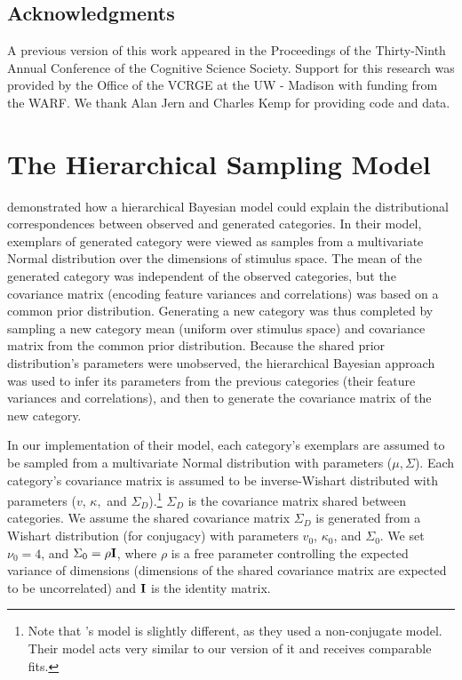 \documentclass[12pt]{article}
\begin{document}
\begin{flushleft}
\clearpage




\section{Acknowledgments}
A previous version of this work appeared in the Proceedings of the Thirty-Ninth Annual Conference of the Cognitive Science Society. Support for this research was provided by the Office of the VCRGE at the UW - Madison with funding from the WARF. We thank Alan Jern and Charles Kemp for providing code and data.



\end{flushleft}


\clearpage


\clearpage


\appendix

\section{The Hierarchical Sampling Model}
\label{ap:hsampling-definition}

\cite{jern2013probabilistic} demonstrated how a hierarchical Bayesian model could explain the distributional correspondences between observed and generated categories. In their model, exemplars of generated category were viewed as samples from a multivariate Normal distribution over the dimensions of stimulus space. The mean of the generated category was independent of the observed categories, but the covariance matrix (encoding feature variances and correlations) was based on a common prior distribution. Generating a new category was thus completed by sampling a new category mean (uniform over stimulus space) and covariance matrix from the common prior distribution. Because the shared prior distribution's parameters were unobserved, the hierarchical Bayesian approach was used to infer its parameters from the previous categories (their feature variances and correlations), and then to generate the covariance matrix of the new category.

In our implementation of their model, each category's exemplars are assumed to be sampled from a multivariate Normal distribution with parameters ($\mu, \Sigma$). Each category's covariance matrix is assumed to be inverse-Wishart distributed with parameters ($v$, $\kappa,$ and $\Sigma_D$).\footnote{Note that \citet{jern2013probabilistic}'s model is slightly different, as they used a non-conjugate model. Their model acts very similar to our version of it and receives comparable fits.} $\Sigma_D$ is the covariance matrix shared between categories. We assume the shared covariance matrix $\Sigma_D$ is generated from a Wishart distribution (for conjugacy) with parameters $v_0$, $\kappa_0$, and $\Sigma_0$. We set $\nu_0 = 4$, and $\Sigma_0 = \rho {\bf I}$, where $\rho$ is a free parameter controlling the expected variance of dimensions (dimensions of the shared covariance matrix are expected to be uncorrelated) and ${\bf I}$ is the identity matrix.
\end{document}
